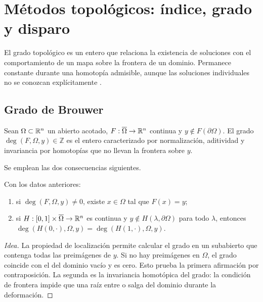\fi
\HAFOGeoRenderBlocktrue
\ifdefined\HAFOGeoBlockSelect
  \HAFOGeoRenderBlockfalse
  \ifdefined\HAFOGeoBlockDegree\HAFOGeoRenderBlocktrue\fi
\fi
\ifHAFOGeoRenderBlock
\HAFOStudyNeedspace
\section{Métodos topológicos: índice, grado y disparo}
\label{sec:geo-degree}

\HAFOCardDegree

El grado topológico es un entero que relaciona la existencia de soluciones
con el comportamiento de un mapa sobre la frontera de un dominio. Permanece
constante durante una homotopía admisible, aunque las soluciones individuales
no se conozcan explícitamente \cite{Amster2021MetodosTopologicos}.

\subsection{Grado de Brouwer}

\begin{definition}
Sean \(\Omega\subset\mathbb{R}^n\) un abierto acotado,
\(F:\overline\Omega\to\mathbb{R}^n\) continua y
\(y\notin F(\partial\Omega)\). El grado
\(\deg(F,\Omega,y)\in\mathbb Z\) es el entero caracterizado por normalización,
aditividad y invariancia por homotopías que no llevan la frontera sobre \(y\).
\end{definition}

Se emplean las dos consecuencias siguientes.

\begin{proposition}
Con los datos anteriores:
\begin{enumerate}
  \item si \(\deg(F,\Omega,y)\ne0\), existe \(x\in\Omega\) tal que
        \(F(x)=y\);
  \item si \(H:[0,1]\times\overline\Omega\to\mathbb{R}^n\) es continua y
        \(y\notin H(\lambda,\partial\Omega)\) para todo \(\lambda\), entonces
        \(\deg(H(0,\cdot),\Omega,y)=
        \deg(H(1,\cdot),\Omega,y)\).
\end{enumerate}
\end{proposition}

\begin{proof}[Idea]
La propiedad de localización permite calcular el grado en un subabierto que
contenga todas las preimágenes de \(y\). Si no hay preimágenes en
\(\Omega\), el grado coincide con el del dominio vacío y es cero. Esto
prueba la primera afirmación por contraposición. La segunda es la invariancia
homotópica del grado: la condición de frontera impide que una raíz entre o
salga del dominio durante la deformación.
\end{proof}

